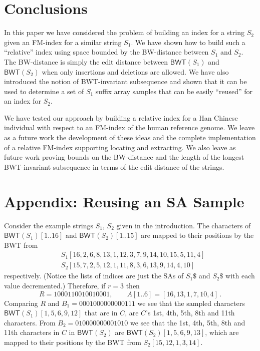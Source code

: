 \documentclass{llncs}
\newcommand{\BWT}
  {\ensuremath{\mathsf{BWT}}}
\begin{document}
\section{Conclusions}\label{sec:concl}



In this paper we have considered the problem of building an index for a
string $S_2$ given an FM-index for a similar string $S_1$. We have shown how
to build such a ``relative'' index using space bounded by the BW-distance
between $S_1$ and $S_2$. The BW-distance is simply the edit distance between
$\BWT(S_1)$ and $\BWT(S_2)$ when only insertions and deletions are allowed.
We have also introduced the notion of BWT-invariant subsequence and shown
that it can be used to determine a set of $S_1$ suffix array samples that can
be easily ``reused'' for an index for $S_2$.

We have tested our approach by building a relative index for a Han Chinese
individual with respect to an FM-index of the human reference genome. We
leave as a future work the development of these ideas and the complete
implementation of a relative FM-index supporting locating and extracting.  We
also leave as future work proving bounds on the BW-distance and the length of
the longest BWT-invariant subsequence in terms of the edit distance of the
strings.






\appendix

\section*{Appendix: Reusing an SA Sample} \label{sec:sample}

Consider the example strings $S_1$, $S_2$ given in the introduction.  The characters of
\(\BWT (S_1) [1..16]\) and \(\BWT (S_2) [1..15]\) are mapped to their
positions by the BWT from
\begin{align*}
& S_1 [16, 2, 6, 8, 13, 1, 12, 3, 7, 9, 14, 10, 15, 5, 11, 4]\\
& S_2 [15, 7, 2, 5, 12, 1, 11, 8, 3, 6, 13, 9, 14, 4, 10]
\end{align*}
respectively.  (Notice the lists of indices are just the SAs of $S_1\$$ and
$S_2\$$ with each value decremented.)  Therefore, if \(r = 3\) then
$$
R = 1000110010010001, \qquad
A [1..6] = [16, 13, 1, 7, 10, 4]\,.
$$
Comparing $R$ and
\(B_1 = 0001000000000111\)
we see that the sampled characters \(\BWT (S_1) [1, 5, 6, 9, 12]\) that are
in $C$, are $C$'s 1st, 4th, 5th, 8th and 11th characters.  From
\(B_2 = 010000000001010\)
we see that the 1st, 4th, 5th, 8th and 11th characters in $C$ in \(\BWT
(S_2)\) are \(\BWT (S_2) [1, 5, 6, 9, 13]\), which are mapped to their
positions by the BWT from \(S_2 [15, 12, 1, 3, 14]\).
\end{document}
